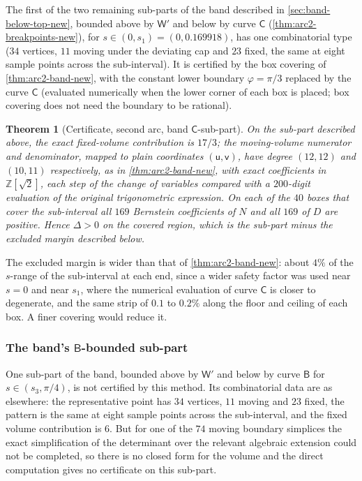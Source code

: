 \documentclass[11pt,reqno]{amsart}
\renewcommand{\_}{\origunderscore\allowbreak}
\numberwithin{equation}{section}
\theoremstyle{plain}
\newtheorem{thm}{Theorem}[section]
\theoremstyle{definition}
\theoremstyle{remark}
\newcommand{\tilt}{\varphi}                  %
\newcommand{\arcp}{s}                        %
\newcommand{\defect}{\Delta}                 %
\begin{document}
The first of the two remaining sub-parts of the band described in
\cref{sec:band-below-top-new}, bounded above by $\mathsf W'$ and below
by curve $\mathsf C$ (\cref{thm:arc2-breakpoints-new}), for
$\arcp\in(0,\arcp_1)=(0,0.169918)$, has one combinatorial type ($34$
vertices, $11$ moving under the deviating cap and $23$ fixed, the same at
eight sample points across the sub-interval). It is certified by the box
covering of \cref{thm:arc2-band-new}, with the constant lower boundary
$\tilt=\pi/3$ replaced by the curve $\mathsf C$
(evaluated numerically when the lower corner of each box is placed;
box covering does not need the boundary to be rational).

\begin{thm}[Certificate, second arc, band \texorpdfstring{$\mathsf C$}{C}-sub-part]\label{thm:arc2-bandC-new}
On the sub-part described above, the exact fixed-volume contribution is
$17/3$; the moving-volume numerator and denominator, mapped to plain
coordinates $(\mathsf u,\mathsf v)$, have degree $(12,12)$ and $(10,11)$
respectively, as in \cref{thm:arc2-band-new}, with exact coefficients
in $\mathbb{Z}[\sqrt2]$, each step of the change of variables compared
with a $200$-digit evaluation of the original trigonometric expression.
On each of the $40$ boxes that cover the sub-interval all $169$
Bernstein coefficients of $N$ and all $169$ of $D$ are positive. Hence $\defect>0$ on the
covered region, which is the sub-part minus the excluded margin
described below.
\end{thm}

The excluded margin is wider than that of \cref{thm:arc2-band-new}:
about $4\%$ of the $\arcp$-range of the sub-interval at each end, since
a wider safety factor was used near $\arcp=0$ and near $\arcp_1$, where
the numerical evaluation of curve $\mathsf C$ is closer to degenerate,
and the same strip of $0.1$ to $0.2\%$ along the floor and ceiling of
each box. A finer covering would reduce it.

\subsubsection{The band's \texorpdfstring{$\mathsf B$}{B}-bounded sub-part}\label{sec:arc2-bandB-new}

One sub-part of the band, bounded above by $\mathsf W'$ and below by
curve $\mathsf B$ for $\arcp\in(\arcp_3,\pi/4)$, is not certified by
this method. Its combinatorial data are as elsewhere: the representative
point has $34$ vertices, $11$ moving and $23$ fixed, the pattern is the
same at eight sample points across the sub-interval, and the fixed volume
contribution is $6$. But for one of the $74$ moving boundary simplices the exact
simplification of the determinant over the relevant algebraic extension
could not be completed, so there is no closed form for the volume and the
direct computation gives no certificate on this sub-part.
\end{document}
